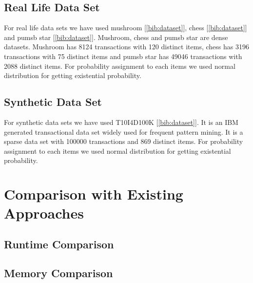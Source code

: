 \subsection{Real Life Data Set}
For real life data sets we have used mushroom [\ref{bib:dataset}], chess [\ref{bib:dataset}] and pumsb star [\ref{bib:dataset}]. Mushroom, chess and pumsb star are dense datasets. Mushroom has 8124 transactions with 120 distinct items, chess has 3196 transactions with 75 distinct items and pumsb star has 49046 transactions with 2088 distinct items. For probability assignment to each items we used normal distribution for getting existential probability.
\subsection{Synthetic Data Set}
For synthetic data sets we have used T10I4D100K [\ref{bib:dataset}]. It is an IBM generated transactional data set widely used for frequent pattern mining. It is a sparse data set with 100000 transactions and 869 distinct items. For probability assignment to each items we used normal distribution for getting existential probability.




\section{Comparison with Existing Approaches}
\subsection{Runtime Comparison}






\subsection{Memory Comparison}


%
%
